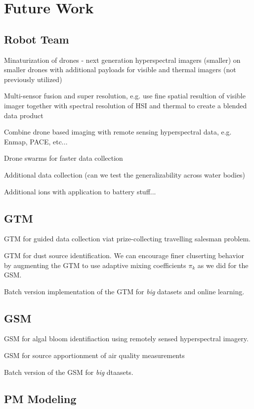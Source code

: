 \chapter{Future Work}\label{ch:future-work}

\section{Robot Team}

Minaturization of drones - next generation hyperspectral imagers (smaller) on smaller drones with additional payloads for visible and thermal imagers (not previously utilized)

Multi-sensor fusion and super resolution, e.g. use fine spatial resultion of visible imager together with spectral resolution of HSI and thermal to create a blended data product

Combine drone based imaging with remote sensing hyperspectral data, e.g. Enmap, PACE, etc...

Drone swarms for faster data collection

Additional data collection (can we test the generalizability across water bodies)

Additional ions with application to battery stuff...

\section{GTM}

GTM for guided data collection viat prize-collecting travelling salesman problem.

GTM for dust source identification. We can encourage finer cluserting behavior by augmenting the GTM to use adaptive mixing coefficients $\pi_k$ as we did for the GSM.

Batch version implementation of the GTM for \textit{big} datasets and online learning.

\section{GSM}

GSM for algal bloom identifiaction using remotely sensed hyperspectral imagery.

GSM for source apportionment of air quality measurements

Batch version of the GSM for \textit{big} dtaasets.


\section{PM Modeling}

